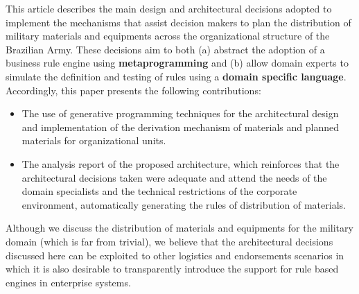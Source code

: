 This article describes the main design and architectural decisions adopted to implement the mechanisms that assist 
decision makers to plan the distribution of military materials and equipments across the organizational structure 
of the Brazilian Army. These decisions aim to both (a) abstract the adoption of a business rule engine using {\bf metaprogramming} 
and (b) allow domain experts to simulate the definition and testing of rules using 
a {\bf domain specific language}. Accordingly, this paper presents the following contributions:

\begin{itemize}
\item The use of generative programming techniques for the architectural design and implementation of the derivation mechanism of materials and planned materials for organizational units.

\item The analysis report of the proposed architecture, which reinforces that the architectural decisions taken were adequate and attend the needs of the domain specialists and the technical restrictions of the corporate environment, automatically generating the rules of distribution of materials.
\end{itemize} 


Although we discuss the distribution of materials and equipments for the military domain (which is far from trivial), we believe that the architectural decisions discussed here can be exploited to other logistics and endorsements scenarios in which it is also desirable to transparently introduce the support for rule based engines in enterprise systems.

